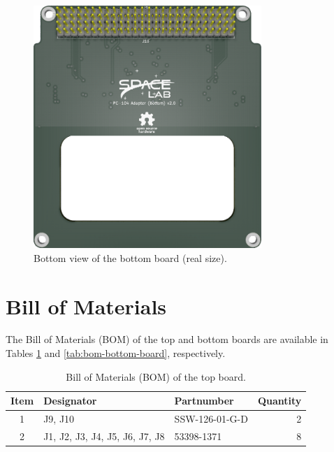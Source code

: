 \begin{figure}[!htb]
    \begin{center}
        \includegraphics[width=8.626cm]{figures/pc104-adapter-bottom-bottom}
        \caption{Bottom view of the bottom board (real size).}
        \label{fig:bottom-board-bottom}
    \end{center}
\end{figure}

\section{Bill of Materials}

The Bill of Materials (BOM) of the top and bottom boards are available in Tables \ref{tab:bom-top-board} and \ref{tab:bom-bottom-board}, respectively.

\begin{table}[!h]
    \centering
    \begin{tabular}{cllr}
        \toprule[1.5pt]
        \textbf{Item}   & \textbf{Designator}            & \textbf{Partnumber} & \textbf{Quantity} \\
        \midrule
        1               & J9, J10                        & SSW-126-01-G-D      & 2                 \\
        2               & J1, J2, J3, J4, J5, J6, J7, J8 & 53398-1371          & 8                 \\
        \bottomrule[1.5pt]
    \end{tabular}
    \caption{Bill of Materials (BOM) of the top board.}
    \label{tab:bom-top-board}
\end{table}

